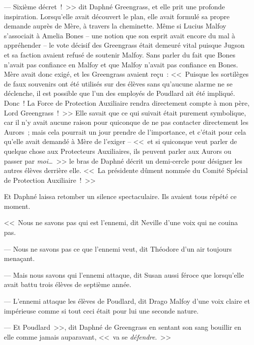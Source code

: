 --- Sixième décret~!~>> dit Daphné Greengrass, et elle prit une profonde inspiration. Lorsqu'elle avait découvert le plan, elle avait formulé sa propre demande auprès de Mère, à travers la cheminette. Même si Lucius Malfoy s'associait à Amelia Bones -- une notion que son esprit avait encore du mal à appréhender -- le vote décisif des Greengrass était demeuré vital puisque Jugson et sa faction avaient refusé de soutenir Malfoy. Sans parler du fait que Bones n'avait pas confiance en Malfoy et que Malfoy n'avait pas confiance en Bones. Mère avait donc exigé, et les Greengrass avaient reçu~: <<~Puisque les sortilèges de faux souvenirs ont été utilisés sur des élèves sans qu'aucune alarme ne se déclenche, il est possible que l'un des employés de Poudlard ait été impliqué. Donc~! La Force de Protection Auxiliaire rendra directement compte à mon père, Lord Greengrass~!~>> Elle savait que ce qui suivait était purement symbolique, car il n'y avait aucune raison pour quiconque de ne pas contacter directement les Aurors~; mais cela pourrait un jour prendre de l'importance, et c'était pour cela qu'elle avait demandé à Mère de l'exiger -- <<~et si quiconque veut parler de quelque chose aux Protecteurs Auxiliaires, ils peuvent parler aux Aurors ou passer par \emph{moi}…~>> le bras de Daphné décrit un demi-cercle pour désigner les autres élèves derrière elle. <<~La présidente dûment nommée du Comité Spécial de Protection Auxiliaire~!~>>

Et Daphné laissa retomber un silence spectaculaire. Ils avaient tous répété ce moment.

<<~Nous ne savons pas qui est l'ennemi, dit Neville d'une voix qui ne couina pas.

--- Nous ne savons pas ce que l'ennemi veut, dit Théodore d'un air toujours menaçant.

--- Mais nous savons qui l'ennemi attaque, dit Susan aussi féroce que lorsqu'elle avait battu trois élèves de septième année.

--- L'ennemi attaque les élèves de Poudlard, dit Drago Malfoy d'une voix claire et impérieuse comme si tout ceci était pour lui une seconde nature.

--- Et Poudlard~>>, dit Daphné de Greengrass en sentant son sang bouillir en elle comme jamais auparavant, <<~va se \emph{défendre}.~>>
